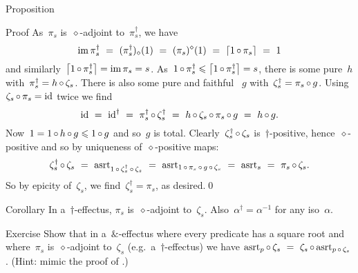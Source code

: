 \documentclass[b]{subfiles}
\begin{document}
\begin{parsec}
\begin{point}{Proposition}
\begin{point}{Proof}
As~$\pi_s$ is~$\diamond$-adjoint to~$\pi_s^\dagger$,
we have
\begin{equation*}
\IM \pi_s^\dagger
 \ = \  (\pi^\dagger_s)_\diamond(1) \ =\ 
 (\pi_s)^\diamond(1) \ = \  \ceil{1 \after \pi_s}
 \ =\  1
\end{equation*}
and similarly~$\left\lceil1 \mathop{\circ} \pi_s^\dagger\right\rceil = \operatorname{im} \pi_s = s$.
As~$1 \mathop{\circ} \pi_s^\dagger \leqslant \left\lceil1 \mathop{\circ} \pi_s^\dagger\right\rceil = s$,
    there is some pure~$h$ with~$\pi_s^\dagger = h \mathop{\circ} \zeta_s$.
There is also some pure and faithful \TODO{...}~$g$
    with~$\zeta_s^\dagger = \pi_s \mathop{\circ} g$.
Using~$\zeta_s \mathop{\circ} \pi_s = \operatorname{id}$ twice we find
\begin{equation}\label{eq-dagger-zeta-pi-conn}
    \operatorname{id} \ =\  \operatorname{id}^\dagger
    \ = \ \pi_s^\dagger \mathop{\circ} \zeta_s^\dagger
    \ = \ h \mathop{\circ} \zeta_s \mathop{\circ} \pi_s \mathop{\circ} g 
    \ = \ h \mathop{\circ} g.
\end{equation}
Now~$1= 1 \mathop{\circ} h \mathop{\circ} g \leqslant 1 \mathop{\circ} g$ and so~$g$ is total.
Clearly~$\zeta_s^\dagger\mathop{\circ}\zeta_s$ is~$\dagger$-positive,
    hence~$\diamond$-positive and so by uniqueness of~$\diamond$-positive maps:
\begin{equation*}
\zeta_s^\dagger \mathop{\circ} \zeta_s
    \ = \ \mathrm{asrt}_{1 \mathop{\circ} \zeta_s^\dagger \mathop{\circ} \zeta_s}
    \ =\  \mathrm{asrt}_{1 \mathop{\circ} \pi_s \mathop{\circ} g\mathop{\circ} \zeta_s}
    \ =\  \mathrm{asrt}_s
    \ =\  \pi_s \mathop{\circ} \zeta_s.
\end{equation*}
So by epicity of~$\zeta_s$, we find~$\zeta_s^\dagger = \pi_s$, as desired.\qed
\end{point}
\end{point}

\begin{point}{Corollary}%
    In a~$\dagger$-effectus,
        $\pi_s$ is~$\diamond$-adjoint to~$\zeta_s$.
    Also~$\alpha^\dagger = \alpha^{-1}$
        for any iso~$\alpha$.
\end{point}

\begin{point}{Exercise}%
Show that in a~$\&$-effectus
        where every predicate has a square root
        and where~$\pi_s$ is~$\diamond$-adjoint to~$\zeta_s$
        (e.g.~a~$\dagger$-effectus)
        we have
    $\mathrm{asrt}_p \mathop{\circ} \zeta_s \ = \ \zeta_s \mathop{\circ} \mathrm{asrt}_{p \mathop{\circ} \zeta_s}$.
    (Hint: mimic the proof of \sref{asrt-iso}.)
\end{point}


\end{parsec}
\end{document}
